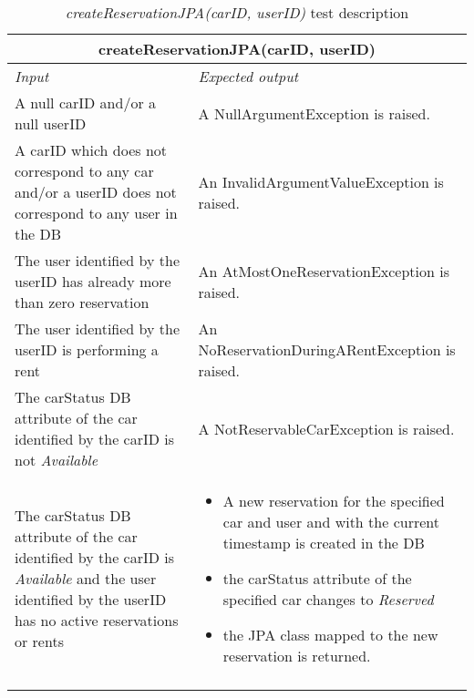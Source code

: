 \begin{longtable}{p{0.4\linewidth}p{0.6\linewidth}}
\multicolumn{2}{c}{\textbf{createReservationJPA(carID, userID)}} \\
\toprule
\emph{Input} & \emph{Expected output} \\
\midrule
A null carID and/or a null userID & A NullArgumentException is raised.\\
\midrule
A carID which does not correspond to any car and/or a userID does not correspond to any user in the DB & An InvalidArgumentValueException is raised. \\
\midrule
The user identified by the userID has already more than zero reservation & An AtMostOneReservationException is raised. \\
\midrule
The user identified by the userID is performing a rent & An NoReservationDuringARentException is raised. \\
\midrule
The carStatus DB attribute of the car identified by the carID is not \emph{Available} & A NotReservableCarException is raised. \\
\midrule
The carStatus DB attribute of the car identified by the carID is \emph{Available} and the user identified by the userID has no active reservations or rents & \begin{itemize}
	\item A new reservation for the specified car and user and with the current timestamp is created in the DB
	\item the carStatus attribute of the specified car changes to \emph{Reserved}
	\item the JPA class mapped to the new reservation is returned.
\end{itemize} \\
\bottomrule
\caption{\emph{createReservationJPA(carID, userID)} test description}
\end{longtable}


